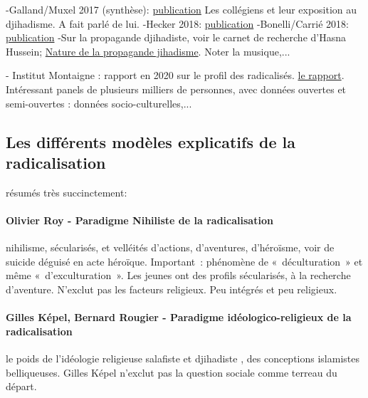 
-Galland/Muxel 2017 (synthèse): \href{https://lejournal.cnrs.fr/nos-blogs/face-au-terrorisme-la-recherche-en-action/une-vaste-enquete-sur-la-radicalite-chez-les}{publication} 
Les collégiens et leur exposition au djihadisme. A fait parlé de lui.
-Hecker 2018: \href{https://www.ifri.org/fr/publications/etudes-de-lifri/focus-strategique/137-nuances-de-terrorisme-djihadistes-de-france-face}{publication}
-Bonelli/Carrié 2018:  \href{http://www.justice.gouv.fr/art_pix/Rapport_final_Bonelli_PJJ.PDF}{publication} 
-Sur la propagande djihadiste, voir le carnet de recherche d’Hasna Hussein; \href{https://cdradical.hypotheses.org/author/hussein}{Nature de la propagande jihadisme}. Noter la musique,... 

- Institut Montaigne : rapport en 2020 sur le profil des radicalisés. \href{https://www.institutmontaigne.org/publications/la-fabrique-de-lislamisme}{le rapport}. Intéressant panels de plusieurs milliers de personnes, avec données ouvertes et semi-ouvertes : données socio-culturelles,...

\subsection{Les différents modèles explicatifs de la radicalisation}
résumés très succinctement:
\paragraph{Olivier Roy - Paradigme Nihiliste de la radicalisation}
nihilisme, sécularisés, et velléités d’actions, d’aventures, d’héroïsme, voir de suicide déguisé en acte héroïque.  Important : phénomène de « déculturation » et même « d’exculturation ».
 Les jeunes ont des profils sécularisés, à la recherche d'aventure. N'exclut pas les facteurs religieux. Peu intégrés et peu religieux.

\paragraph{Gilles Képel, Bernard Rougier - Paradigme idéologico-religieux de la radicalisation}
le poids de l’idéologie religieuse salafiste et djihadiste , des conceptions islamistes belliqueuses. Gilles Képel n'exclut pas la question sociale comme terreau du départ. 


